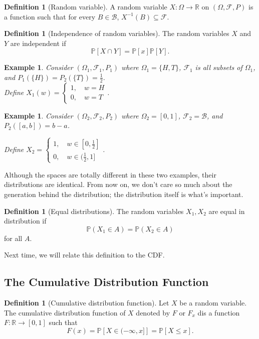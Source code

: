 \documentclass{tufte-handout}
\newcommand*\R{\mathbb{R}}
\renewcommand{\P}{\mathbb{P}}
\newtheorem{ex}[thm]{Example}
\theoremstyle{definition}
\newtheorem{defn}[thm]{Definition}
\begin{document}
\begin{defn}[Random variable]
	A random variable $X: \Omega \to \R$ on $(\Omega, \mathscr{F}, P)$ is a function such that for every $B \in \mathscr{B}$, $X^{-1}(B) \subseteq \mathscr{F}$.
\end{defn}

\begin{defn}[Independence of random variables]
	The random variables $X$ and $Y$ are independent if \[
		\P\left[X \cap Y\right] = \P\left[x\right] \P\left[Y\right] 
	.\] 
\end{defn}



\begin{ex}
	Consider $(\Omega_1, \mathscr{F}_1, P_1)$ where $\Omega_1 = \{H, T\}$, $\mathscr{F}_1$ is all subsets of $\Omega_1$, and $P_1(\{H\}) = P_2(\{T\}) = \frac{1}{2}$. \\ Define $X_1(w) = \begin{cases}
		1, \quad w = H \\ 0, \quad w = T
	\end{cases}$.
\end{ex}

\begin{ex}
	Consider $(\Omega_2, \mathscr{F}_2, P_2)$ where $\Omega_2 = [0,1]$, $\mathscr{F}_2 = \mathscr{B}$, and $P_2\left( [a,b] \right) = b-a$.

	Define $X_2 = \begin{cases}
		1, \quad w \in [0,\frac{1}{2}] \\
		0, \quad w \in (\frac{1}{2}, 1]
	\end{cases}$.
\end{ex}

Although the spaces are totally different in these two examples, their distributions are identical. From now on, we don't care so much about the generation behind the distribution; the distribution itself is what's important.

\begin{defn}[Equal distributions]
	The random variables $X_1, X_2$ are equal in distribution if \[
		\P(X_1 \in A) = \P(X_2 \in A)
	\] for all $A$.
\end{defn}

Next time, we will relate this definition to the CDF.


\subsection{The Cumulative Distribution Function}
\begin{defn}[Cumulative distribution function]
	Let $X$ be a random variable. The cumulative distribution function of $X$ denoted by $F$ or $F_x$ dis a function $F: \R \to [0,1]$ such that \[
		F(x) = \P\left[X \in (-\infty, x] \right] = \P\left[X \le x \right] 
	.\] 		
\end{defn}
\end{document}
